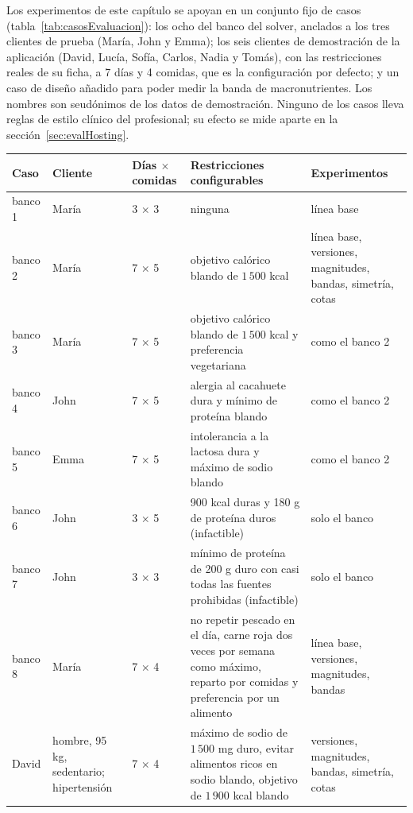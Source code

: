 Los experimentos de este capítulo se apoyan en un conjunto fijo de casos (tabla~\ref{tab:casosEvaluacion}): los ocho del banco del solver, anclados a los tres clientes de prueba (María, John y Emma); los seis clientes de demostración de la aplicación (David, Lucía, Sofía, Carlos, Nadia y Tomás), con las restricciones reales de su ficha, a 7 días y 4 comidas, que es la configuración por defecto; y un caso de diseño añadido para poder medir la banda de macronutrientes. Los nombres son seudónimos de los datos de demostración. Ninguno de los casos lleva reglas de estilo clínico del profesional; su efecto se mide aparte en la sección~\ref{sec:evalHosting}.

\begin{table}[htbp]
\centering
\scriptsize
\setlength{\tabcolsep}{4pt}
\begin{tabular}{|p{1.5cm}|p{3cm}|p{1.3cm}|p{4.6cm}|p{3cm}|}
\hline
\textbf{Caso} & \textbf{Cliente} & \textbf{Días $\times$ comidas} & \textbf{Restricciones configurables} & \textbf{Experimentos} \\
\hline
banco 1 & María & 3 $\times$ 3 & ninguna & línea base \\
\hline
banco 2 & María & 7 $\times$ 5 & objetivo calórico blando de $1\,500$ kcal & línea base, versiones, magnitudes, bandas, simetría, cotas \\
\hline
banco 3 & María & 7 $\times$ 5 & objetivo calórico blando de $1\,500$ kcal y preferencia vegetariana & como el banco 2 \\
\hline
banco 4 & John & 7 $\times$ 5 & alergia al cacahuete dura y mínimo de proteína blando & como el banco 2 \\
\hline
banco 5 & Emma & 7 $\times$ 5 & intolerancia a la lactosa dura y máximo de sodio blando & como el banco 2 \\
\hline
banco 6 & John & 3 $\times$ 5 & 900 kcal duras y 180 g de proteína duros (infactible) & solo el banco \\
\hline
banco 7 & John & 3 $\times$ 3 & mínimo de proteína de 200 g duro con casi todas las fuentes prohibidas (infactible) & solo el banco \\
\hline
banco 8 & María & 7 $\times$ 4 & no repetir pescado en el día, carne roja dos veces por semana como máximo, reparto por comidas y preferencia por un alimento & línea base, versiones, magnitudes, bandas \\
\hline
David & hombre, 95 kg, sedentario; hipertensión & 7 $\times$ 4 & máximo de sodio de $1\,500$ mg duro, evitar alimentos ricos en sodio blando, objetivo de $1\,900$ kcal blando & versiones, magnitudes, bandas, simetría, cotas \\

\end{tabular}
\end{table}
